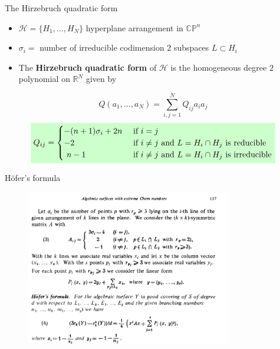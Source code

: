 \documentclass{beamer}
\newcommand{\R}{\mathbb{R}}
\newcommand{\CP}{\mathbb{CP}}
\newcommand{\mH}{\mathcal{H}}
\newcommand{\mathcolorbox}[2]{\colorbox{#1}{$\displaystyle #2$}}
\begin{document}
\begin{frame}{The Hirzebruch quadratic form}
	\begin{itemize}
		\item \(\mH = \{H_1, \ldots, H_N\}\) hyperplane arrangement in \(\CP^n\)
		\item \(\sigma_i = \) number of irreducible codimension \(2\) subspaces \(L \subset H_i\)
		\item The \textbf{Hirzebruch quadratic form} of \(\mH\) is the homogeneous degree \(2\) polynomial on \(\R^N\) given by
	\end{itemize}
	\[
	Q(a_1, \ldots, a_N) = \sum_{i,j = 1}^N Q_{ij} a_i a_j 
	\]
	\[
	\mathcolorbox{green!20}{
	Q_{ij} = \begin{cases}
		- (n+1) \sigma_i + 2n &\text{ if } i = j  \\
		-2 &\text{ if }  i \neq j \text{ and } L = H_i \cap H_j \text{ is reducible} \\
		\,\, n-1 &\text{ if } i \neq j \text{ and } L = H_i \cap H_j \text{ is irreducible} 
	\end{cases}
}
	\]
\end{frame}

\begin{frame}{H\"ofer's formula}
	\begin{center}
		\begin{figure}
			\includegraphics[width=0.8\textwidth,height=0.8\textheight,keepaspectratio]{hofer}
		\end{figure}
	\end{center}
\end{frame}
\end{document}

